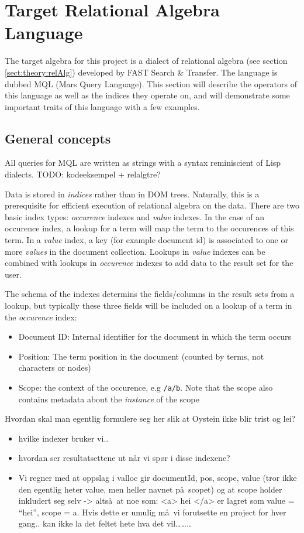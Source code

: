 \section{Target Relational Algebra Language}
The target algebra for this project is a dialect of relational algebra (see
section \ref{sect:theory:relAlg}) developed by FAST Search \& Transfer. The
language is dubbed MQL (Mars Query Language). This section will describe the
operators of this language as well as the indices they operate on, and will
demonstrate some important traits of this language with a few examples. 

\subsection{General concepts}
All queries for MQL are written as strings with a syntax reminiscient of Lisp
dialects. TODO: kodeeksempel + relalgtre?

Data is stored in \textit{indices} rather than in DOM trees. Naturally, this is
a prerequisite for efficient execution of relational algebra on the data. There
are two basic index types: \textit{occurence} indexes and \textit{value}
indexes. In the case of an occurence index, a lookup for a term will map the
term to the occurences of this term. In a \textit{value} index, a key (for
example document id) is associated to one or more \textit{values} in the
document collection. Lookups in \textit{value} indexes can be combined with
lookups in \textit{occurence} indexes to add data to the result set for the
user.

The schema of the indexes determins the fields/columns in the result sets from
a lookup, but typically these three fields will be included on a lookup of a
term in the \textit{occurence} index:
\begin{itemize}
  \item Document ID: Internal identifier for the document in which the term
  occurs
  \item Position: The term position in the document (counted by terms, not
  characters or nodes)
  \item Scope: the context of the occurence, e.g \texttt{/a/b}. Note that the
  scope also contains metadata about the \textit{instance} of the scope
\end{itemize}

Hvordan skal man egentlig formulere seg her slik at Oystein ikke blir trist og
lei?

\begin{itemize}
  \item hvilke indexer bruker vi..
  \item hvordan ser resultatsettene ut n\aa r vi sp\o r i disse indexene?
  \item Vi regner med at oppslag i valloc gir {documentId, pos, scope, value} (tror ikke den egentlig heter value,
  men heller navnet p\aa~scopet) og at scope holder inkludert seg selv -> alts\aa~at noe som: <a> hei </a> er
  lagret som {value = ``hei'', scope = a}. Hvis dette er umulig m\aa~vi forutsette en project for hver gang.. kan
  ikke la det feltet hete hva det vil\ldots\ldots\ldots
\end{itemize}

